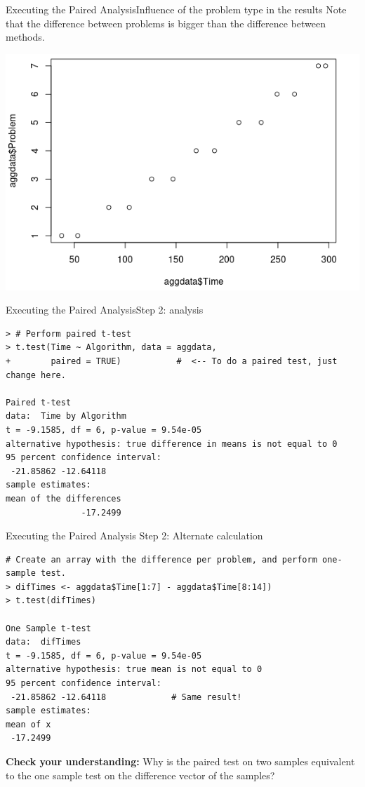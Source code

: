 \begin{frame}{Executing the Paired Analysis}{Influence of the problem type in the results}
      Note that the difference between problems is bigger than the difference between methods.
  \begin{center}

  \includegraphics[width=.6\textwidth]{../img/steelrods_timediff}
  \end{center}
\end{frame}

\begin{frame}[fragile]{Executing the Paired Analysis}{Step 2: analysis}
  {\smaller
\begin{verbatim}
> # Perform paired t-test
> t.test(Time ~ Algorithm, data = aggdata,
+        paired = TRUE)           #  <-- To do a paired test, just change here.

Paired t-test
data:  Time by Algorithm
t = -9.1585, df = 6, p-value = 9.54e-05
alternative hypothesis: true difference in means is not equal to 0
95 percent confidence interval:
 -21.85862 -12.64118
sample estimates:
mean of the differences
               -17.2499
\end{verbatim}}
\end{frame}




\begin{frame}[fragile]
{Executing the Paired Analysis}
{Step 2: Alternate calculation}

{\smaller
\begin{verbatim}
# Create an array with the difference per problem, and perform one-sample test.
> difTimes <- aggdata$Time[1:7] - aggdata$Time[8:14])
> t.test(difTimes)

One Sample t-test
data:  difTimes
t = -9.1585, df = 6, p-value = 9.54e-05
alternative hypothesis: true mean is not equal to 0
95 percent confidence interval:
 -21.85862 -12.64118             # Same result!
sample estimates:
mean of x
 -17.2499
\end{verbatim}}
\bigskip

{\bf Check your understanding:} Why is the paired test on two samples equivalent to the one sample test on the difference vector of the samples?
\end{frame}

